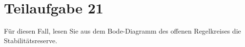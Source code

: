 \section{Teilaufgabe 21}
\begin{aufgabe}
    Für diesen Fall, lesen Sie aus dem Bode-Diagramm des offenen Regelkreises 
    die Stabilitätsreserve.
\end{aufgabe}
